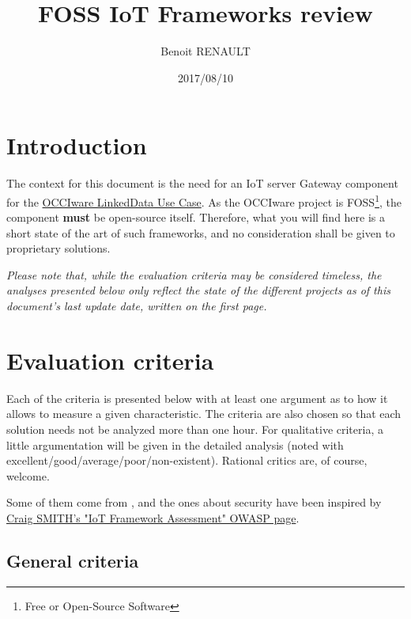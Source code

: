 \documentclass{article}
\title{FOSS IoT Frameworks review}
\author{Benoit RENAULT}
\date{2017/08/10}
\begin{document}
\maketitle

\newpage

\tableofcontents

\newpage

\section{Introduction}

The context for this document is the need for an IoT server Gateway component for the \href{https://github.com/occiware/occiware-ozwillo}{OCCIware LinkedData Use Case}. As the OCCIware project is FOSS\footnote{Free or Open-Source Software}, the component \textbf{must} be open-source itself. Therefore, what you will find here is a short state of the art of such frameworks, and no consideration shall be given to proprietary solutions.

\emph{Please note that, while the evaluation criteria may be considered timeless, the analyses presented below only reflect the state of the different projects as of this document's last update date, written on the first page.}

\section{Evaluation criteria}

Each of the criteria is presented below with at least one argument as to how it allows to measure a given characteristic. The criteria are also chosen so that each solution needs not be analyzed more than one hour. For qualitative criteria, a little argumentation will be given in the detailed analysis (noted with excellent/good/average/poor/non-existent). Rational critics are, of course, welcome.

Some of them come from \href{https://www.thingworx.com/wp-content/uploads/WP_oreilly-media_evaluating-and-choosing-an-iot-platform_978-1-491-95203-0_EN.pdf}{}, and the ones about security have been inspired by \href{https://www.owasp.org/index.php/IoT_Framework_Assessment}{Craig SMITH's "IoT Framework Assessment" OWASP page}.

\subsection{General criteria}
\end{document}
